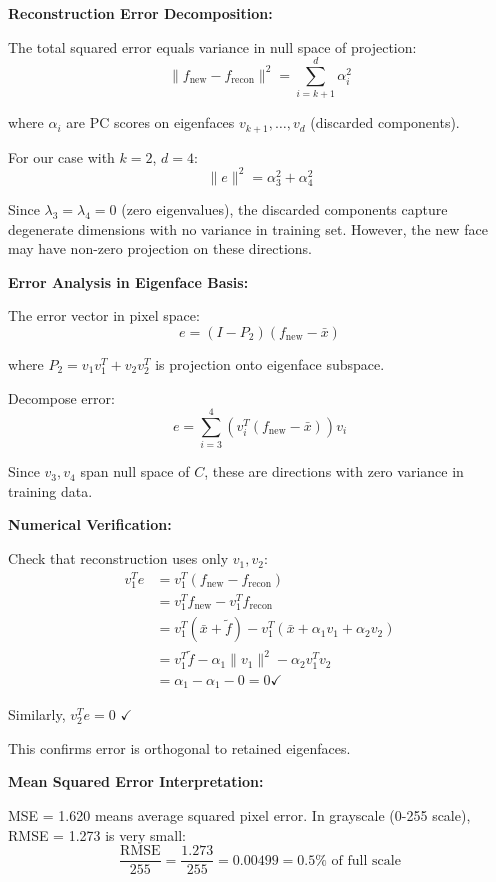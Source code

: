 \documentclass[12pt]{article}
\begin{document}
\begin{explanation}

\textbf{Reconstruction Error Decomposition:}

The total squared error equals variance in null space of projection:
\[
\|f_{\text{new}} - f_{\text{recon}}\|^2 = \sum_{i=k+1}^d \alpha_i^2
\]

where $\alpha_i$ are PC scores on eigenfaces $v_{k+1}, \ldots, v_d$ (discarded components).

For our case with $k=2$, $d=4$:
\[
\|e\|^2 = \alpha_3^2 + \alpha_4^2
\]

Since $\lambda_3 = \lambda_4 = 0$ (zero eigenvalues), the discarded components capture degenerate dimensions with no variance in training set. However, the new face may have non-zero projection on these directions.

\textbf{Error Analysis in Eigenface Basis:}

The error vector in pixel space:
\[
e = (I - P_2)(f_{\text{new}} - \bar{x})
\]

where $P_2 = v_1v_1^T + v_2v_2^T$ is projection onto eigenface subspace.

Decompose error:
\[
e = \sum_{i=3}^4 (v_i^T(f_{\text{new}} - \bar{x}))v_i
\]

Since $v_3, v_4$ span null space of $C$, these are directions with zero variance in training data.

\textbf{Numerical Verification:}

Check that reconstruction uses only $v_1, v_2$:
\begin{align*}
v_1^T e &= v_1^T(f_{\text{new}} - f_{\text{recon}}) \\
&= v_1^T f_{\text{new}} - v_1^T f_{\text{recon}} \\
&= v_1^T(\bar{x} + \tilde{f}) - v_1^T(\bar{x} + \alpha_1 v_1 + \alpha_2 v_2) \\
&= v_1^T\tilde{f} - \alpha_1 \|v_1\|^2 - \alpha_2 v_1^Tv_2 \\
&= \alpha_1 - \alpha_1 - 0 = 0 \checkmark
\end{align*}

Similarly, $v_2^T e = 0$ $\checkmark$

This confirms error is orthogonal to retained eigenfaces.

\textbf{Mean Squared Error Interpretation:}

MSE = 1.620 means average squared pixel error. In grayscale (0-255 scale), RMSE = 1.273 is very small:
\[
\frac{\text{RMSE}}{255} = \frac{1.273}{255} = 0.00499 = 0.5\% \text{ of full scale}
\]


\end{explanation}
\end{document}
